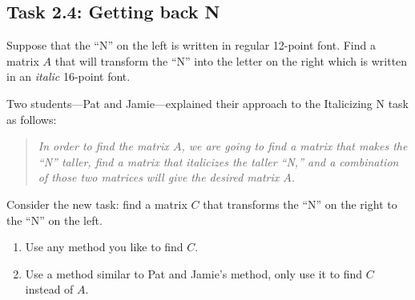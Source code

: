 \documentclass{problemset}
\begin{document}
\begin{iola}
\section*{Task 2.4: Getting back N}

\begin{minipage}{.5\textwidth}
\hfill
{}\hfill
\end{minipage}
\begin{minipage}{.5\textwidth}

Suppose that the ``N'' on the left is written in regular 12-point font.  Find a matrix $A$ that will transform
	the ``N'' into the letter on the right which is written in an \emph{italic} 16-point font.
\end{minipage}

Two students---Pat and Jamie---explained their approach to the Italicizing N task as follows:
\begin{quote}\itshape
	In order to find the matrix $A$, we are going to find a matrix that makes the ``N'' taller,
	find a matrix that italicizes the taller ``N,'' and a combination of those two matrices
	will give the desired matrix $A$.
\end{quote}

Consider the new task: find a matrix $C$ that transforms the ``N'' on the right to
the ``N'' on the left.
\begin{enumerate}
	\item Use any method you like to find $C$.
	\item Use a method similar to Pat and Jamie's method, only use it to find $C$ instead
		of $A$.
\end{enumerate}
\end{iola}
\end{document}
